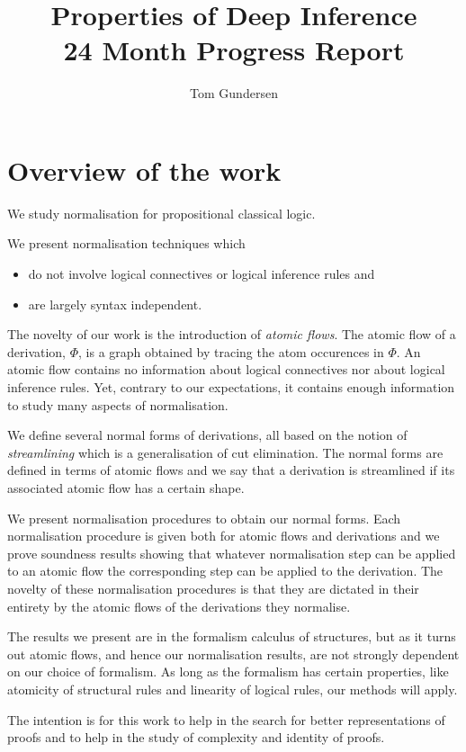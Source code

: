 \documentclass[]{article}
\title{Properties of Deep Inference \\ 24 Month Progress Report}
\author{Tom Gundersen}
\begin{document}
\maketitle

\section{Overview of the work}

We study normalisation for propositional classical logic.

We present normalisation techniques which
\begin{itemize}
\item do not involve logical connectives or logical inference rules and
\item are largely syntax independent.
\end{itemize}

The novelty of our work is the introduction of \emph{atomic flows}. The atomic flow of a derivation, $\Phi$, is a graph obtained by tracing the atom occurences in $\Phi$. An atomic flow contains no information about logical connectives nor about logical inference rules. Yet, contrary to our expectations, it contains enough information to study many aspects of normalisation.

We define several normal forms of derivations, all based on the notion of \emph{streamlining} which is a generalisation of cut elimination. The normal forms are defined in terms of atomic flows and we say that a derivation is streamlined if its associated atomic flow has a certain shape.

We present normalisation procedures to obtain our normal forms. Each normalisation procedure is given both for atomic flows and derivations and we prove soundness results showing that whatever normalisation step can be applied to an atomic flow the corresponding step can be applied to the derivation. The novelty of these normalisation procedures is that they are dictated in their entirety by the atomic flows of the derivations they normalise.

The results we present are in the formalism calculus of structures, but as it turns out atomic flows, and hence our normalisation results, are not strongly dependent on our choice of formalism. As long as the formalism has certain properties, like atomicity of structural rules and linearity of logical rules, our methods will apply.

The intention is for this work to help in the search for better representations of proofs and to help in the study of complexity and identity of proofs.
\end{document}
